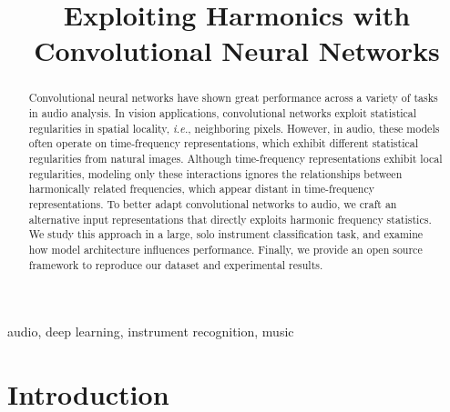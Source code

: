 \documentclass{article}
\title{Exploiting Harmonics with Convolutional Neural Networks}
\def\eg{\emph{e.g.}}
\def\ie{\emph{i.e.}}
\begin{document}
%
\maketitle
%
\begin{abstract}

Convolutional neural networks have shown great performance across a variety of tasks in audio analysis.
In vision applications, convolutional networks exploit statistical regularities in spatial locality, \ie, neighboring pixels.
However, in audio, these models often operate on time-frequency representations, which exhibit different statistical regularities from natural images.
Although time-frequency representations exhibit local regularities, modeling only these interactions ignores the relationships between harmonically related frequencies, which appear distant in time-frequency representations.
To better adapt convolutional networks to audio, we craft an alternative input representations that directly exploits harmonic frequency statistics.
We study this approach in a large, solo instrument classification task, and examine how model architecture influences performance.
Finally, we provide an open source framework to reproduce our dataset and experimental results.
\end{abstract}

\begin{keywords}
    audio, deep learning, instrument recognition, music
\end{keywords}
\section{Introduction}\label{sec:introduction}

\end{document}
